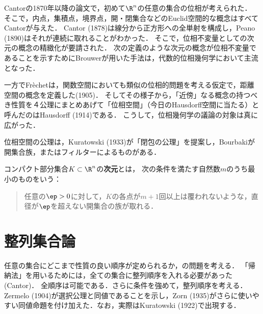 \documentclass[uplatex,dvipdfmx]{jsreport}
\begin{document}
\begin{history}
    Cantorの1870年以降の論文で，初めて$\R^n$の任意の集合の位相が考えられた．
    そこで，内点，集積点，境界点，開・閉集合などのEuclid空間的な概念はすべてCantorが与えた．
    Cantor (1878)は線分から正方形への全単射を構成し，Peano (1890)はそれが連続に取れることがわかった．
    そこで，位相不変量としての次元の概念の精緻化が要請された．
    次の定義のような次元の概念が位相不変量であることを示すためにBrouwerが用いた手法は，代数的位相幾何学において主流となった．

    一方でFr\`{e}chetは，関数空間においても類似の位相的問題を考える仮定で，距離空間の概念を定義した(1905)．
    そしてその様子から，「近傍」なる概念の持つべき性質を４公理にまとめあげて「位相空間」（今日のHausdorff空間に当たる）と呼んだのはHausdorff (1914)である．
    こうして，位相幾何学の議論の対象は真に広がった．

    位相空間の公理は，Kuratowski (1933)が「閉包の公理」を提案し，Bourbakiが開集合族，またはフィルターによるものがある．
    
\end{history}

\begin{definition}
    コンパクト部分集合$K\subset\R^n$の\textbf{次元}とは，
    次の条件を満たす自然数$m$のうち最小のものをいう：
    \begin{quote}
        任意の$\ep>0$に対して，$K$の各点が$m+1$回以上は覆われないような，直径が$\ep$を超えない開集合の族が取れる．
    \end{quote}
\end{definition}

\section{整列集合論}

\begin{tcolorbox}[colframe=ForestGreen, colback=ForestGreen!10!white,breakable,colbacktitle=ForestGreen!40!white,coltitle=black,fonttitle=\bfseries\sffamily,
title=]
    任意の集合にどこまで性質の良い順序が定められるか，の問題を考える．
    「帰納法」を用いるためには，全ての集合に整列順序を入れる必要があった(Cantor)．
    全順序は可能である．さらに条件を強めて，整列順序を考える．
    Zermelo (1904)が選択公理と同値であることを示し，Zorn (1935)がさらに使いやすい同値命題を付け加えた．なお，実際はKuratowski (1922)で出現する．
\end{tcolorbox}
\end{document}
